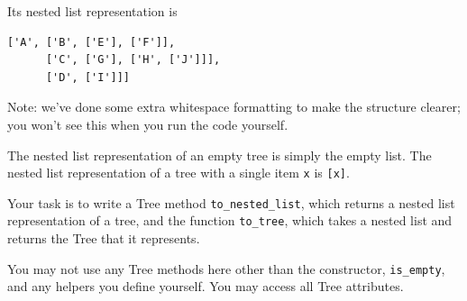 \documentclass{article}
\begin{document}
Its nested list representation is

\begin{verbatim}
['A', ['B', ['E'], ['F']],
      ['C', ['G'], ['H', ['J']]],
      ['D', ['I']]]
\end{verbatim}

Note: we've done some extra whitespace formatting to make the structure clearer; you won't see this when you run the code yourself.

The nested list representation of an empty tree is simply the empty list. The nested list representation of a tree with a single item \verb|x| is \verb|[x]|.

Your task is to write a Tree method \verb|to_nested_list|, which returns a nested list representation of a tree, and the function  \verb|to_tree|, which takes a nested list and returns the Tree that it represents.

You may not use any Tree methods here other than the constructor, \verb|is_empty|, and any helpers you define yourself. You may access all Tree attributes.
\end{document}
